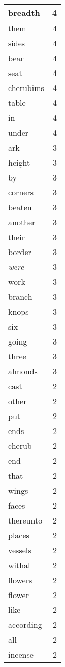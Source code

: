 \begin{center}
\begin{longtable}{l|r}
breadth & 4 \\ \hline
them & 4 \\ \hline
sides & 4 \\ \hline
bear & 4 \\ \hline
seat & 4 \\ \hline
cherubims & 4 \\ \hline
table & 4 \\ \hline
in & 4 \\ \hline
under & 4 \\ \hline
ark & 3 \\ \hline
height & 3 \\ \hline
by & 3 \\ \hline
corners & 3 \\ \hline
beaten & 3 \\ \hline
another & 3 \\ \hline
their & 3 \\ \hline
border & 3 \\ \hline
\emph{were} & 3 \\ \hline
work & 3 \\ \hline
branch & 3 \\ \hline
knops & 3 \\ \hline
six & 3 \\ \hline
going & 3 \\ \hline
three & 3 \\ \hline
almonds & 3 \\ \hline
cast & 2 \\ \hline
other & 2 \\ \hline
put & 2 \\ \hline
ends & 2 \\ \hline
cherub & 2 \\ \hline
end & 2 \\ \hline
that & 2 \\ \hline
wings & 2 \\ \hline
faces & 2 \\ \hline
thereunto & 2 \\ \hline
places & 2 \\ \hline
vessels & 2 \\ \hline
withal & 2 \\ \hline
flowers & 2 \\ \hline
flower & 2 \\ \hline
like & 2 \\ \hline
according & 2 \\ \hline
all & 2 \\ \hline
incense & 2 \\ \hline

\end{longtable}
\end{center}
